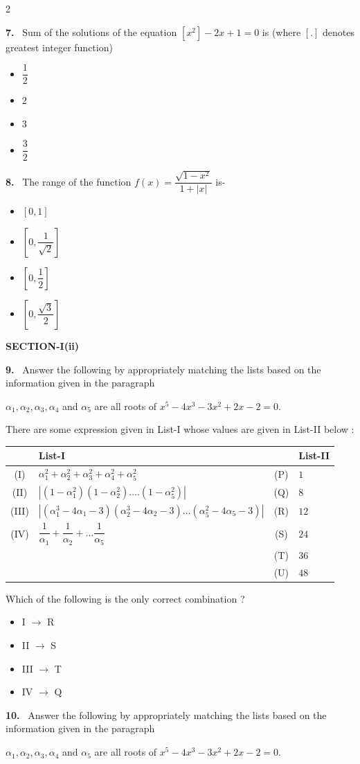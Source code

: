 \documentclass[10pt]{extarticle}
\newcommand{\sect}[1]{\par\smallskip\noindent\textbf{#1}\par}
\newcommand{\qn}[1]{\par\smallskip\noindent\textbf{#1.}~}
\newenvironment{qoptions}{\begin{itemize}[leftmargin=1.8em,itemsep=1pt,topsep=2pt,label={}]}{\end{itemize}}
\newcommand{\opt}[2]{\item[(#1)] #2}
\begin{document}
\begin{multicols}{2}
\begin{qoptions}
\end{qoptions}
\qn{7} Sum of the solutions of the equation $[x^2]-2x+1=0$ is (where $[.]$ denotes greatest integer function)
\begin{qoptions}
\opt{A}{$\dfrac12$}
\opt{B}{$2$}
\opt{C}{$3$}
\opt{D}{$\dfrac32$}
\end{qoptions}
\qn{8} The range of the function $f(x)=\dfrac{\sqrt{1-x^2}}{1+|x|}$ is-
\begin{qoptions}
\opt{A}{$[0,1]$}
\opt{B}{$\left[0,\dfrac{1}{\sqrt2}\right]$}
\opt{C}{$\left[0,\dfrac12\right]$}
\opt{D}{$\left[0,\dfrac{\sqrt3}{2}\right]$}
\end{qoptions}
\sect{SECTION-I(ii)}
\qn{9} Answer the following by appropriately matching the lists based on the information given in the paragraph

$\alpha_1,\alpha_2,\alpha_3,\alpha_4$ and $\alpha_5$ are all roots of $x^5-4x^3-3x^2+2x-2=0$.

There are some expression given in List-I whose values are given in List-II below :

\begin{center}
{\footnotesize\setlength{\tabcolsep}{2pt}\begin{tabular}{|c|p{4.6cm}|c|p{2.4cm}|}\hline
 & \centering List-I & & \centering List-II\tabularnewline\hline
(I) & $\alpha_1^2+\alpha_2^2+\alpha_3^2+\alpha_4^2+\alpha_5^2$ & (P) & $1$\\\hline
(II) & $|(1-\alpha_1^2)(1-\alpha_2^2)\ldots.(1-\alpha_5^2)|$ & (Q) & $8$\\\hline
(III) & $|(\alpha_1^3-4\alpha_1-3)(\alpha_2^3-4\alpha_2-3)\ldots(\alpha_5^2-4\alpha_5-3)|$ & (R) & $12$\\\hline
(IV) & $\dfrac{1}{\alpha_1}+\dfrac{1}{\alpha_2}+\ldots\dfrac{1}{\alpha_5}$ & (S) & $24$\\\hline
 & & (T) & $36$\\\hline
 & & (U) & $48$\\\hline
\end{tabular}}
\end{center}
Which of the following is the only correct combination ?
\begin{qoptions}
\opt{A}{I $\to$ R}
\opt{B}{II $\to$ S}
\opt{C}{III $\to$ T}
\opt{D}{IV $\to$ Q}
\end{qoptions}
\qn{10} Answer the following by appropriately matching the lists based on the information given in the paragraph

$\alpha_1,\alpha_2,\alpha_3,\alpha_4$ and $\alpha_5$ are all roots of $x^5-4x^3-3x^2+2x-2=0$.


\end{multicols}
\end{document}

